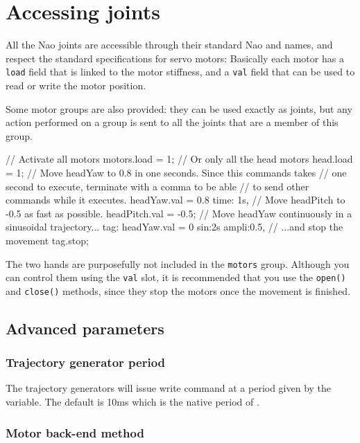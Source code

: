 \section{Accessing joints}
All the Nao joints are accessible through their standard Nao and \urbi
names, and respect the \urbi standard specifications for servo motors:
Basically each motor has a \lstinline{load} field that is linked to the
motor stiffness, and a \lstinline{val} field that can be used to read or
write the motor position.

Some motor groups are also provided: they can be used exactly as joints, but
any action performed on a group is sent to all the joints that are a member
of this group.

\begin{urbiunchecked}
// Activate all motors
motors.load = 1;
// Or only all the head motors
head.load = 1;
// Move headYaw to 0.8 in one seconds. Since this commands takes
// one second to execute, terminate with a comma to be able
// to send other commands while it executes.
headYaw.val = 0.8 time: 1s,
// Move headPitch to -0.5 as fast as possible.
headPitch.val = -0.5;
// Move headYaw continuously in a sinusoidal trajectory...
tag: headYaw.val = 0 sin:2s ampli:0.5,
// ...and stop the movement
tag.stop;
\end{urbiunchecked}

The two hands are purposefully not included in the \lstinline{motors} group.
Although you can control them using the \lstinline{val} slot, it is
recommended that you use the \lstinline{open()} and \lstinline{close()}
methods, since they stop the motors once the movement is finished.

\subsection{Advanced parameters}

\subsubsection{Trajectory generator period}

The trajectory generators will issue write command at a period given by the
 variable. The default is 10ms which is the native
period of \naoqi.

\subsubsection{Motor back-end method}

